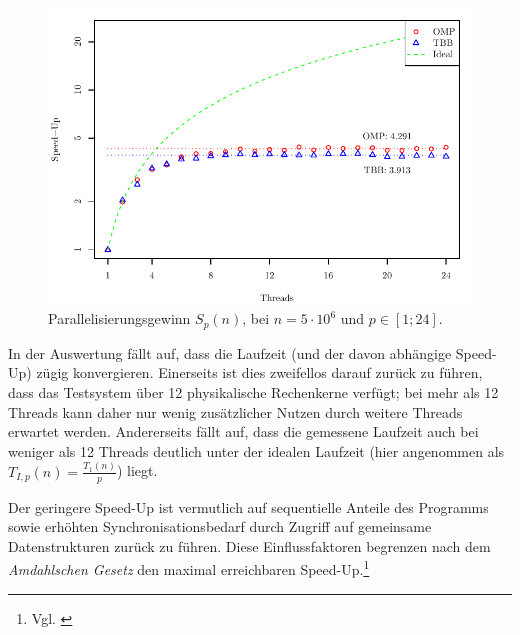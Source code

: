 \documentclass[11pt]{scrartcl}
\begin{document}
\begin{figure}[pbt]
\centering
\includegraphics{../messdaten/s13_speedup.pdf}
\caption{Parallelisierungsgewinn $S_p(n)$, bei $n=5\cdot 10^6$ und $p \in [1;24]$.}
\label{s13_speedup}
\end{figure}

In der Auswertung fällt auf, dass die Laufzeit (und der davon abhängige Speed-Up) zügig konvergieren. Einerseits ist dies zweifellos darauf zurück zu führen, dass das Testsystem über 12 physikalische Rechenkerne verfügt; bei mehr als 12 Threads kann daher nur wenig zusätzlicher Nutzen durch weitere Threads erwartet werden. Andererseits fällt auf, dass die gemessene Laufzeit auch bei weniger als 12 Threads deutlich unter der idealen Laufzeit (hier angenommen als $T_{I,p}(n) = \frac{T_1(n)}{p}$) liegt.

Der geringere Speed-Up ist vermutlich auf sequentielle Anteile des Programms sowie erhöhten Synchronisationsbedarf durch Zugriff auf gemeinsame Datenstrukturen zurück zu führen. Diese Einflussfaktoren begrenzen nach dem \emph{Amdahlschen Gesetz} den maximal erreichbaren Speed-Up.\footnote{Vgl. \cite[S.~318]{bengel_masterkurs_2008}}


\end{document}
